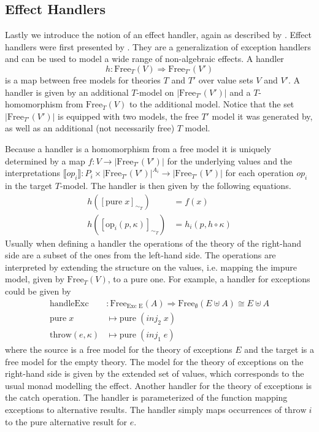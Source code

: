 \subsection{Effect Handlers}
\label{preliminaries:handler}

Lastly we introduce the notion of an effect handler, again as described by
\textcite{DBLP:journals/corr/abs-1807-05923}.
Effect handlers were first presented by \textcite{DBLP:conf/esop/PlotkinP09}.
They are a generalization of exception handlers and can be used to model a wide
range of non-algebraic effects.
A handler
\[
  h : \mathrm{Free}_{T}(V) \Rightarrow \mathrm{Free}_{T'}(V')
\]
is a map between free models for theories $T$ and $T'$ over value sets $V$ and
$V'$.
A handler is given by an additional $T$-model on $|\mathrm{Free}_{T'}(V')|$ and
a $T$-homomorphism from $\mathrm{Free}_{T}(V)$ to the additional model.
Notice that the set $|\mathrm{Free}_{T'}(V')|$ is equipped with two models, the
free $T'$ model it was generated by, as well as an additional (not necessarily
free) $T$ model.

Because a handler is a homomorphism from a free model it is uniquely determined
by a map $f : V \rightarrow |\mathrm{Free}_{T'}(V')|$ for the underlying
values and the interpretations $\lBrack op_i \rBrack : P_i \times
|\mathrm{Free}_{T'}(V')|^{A_i} \rightarrow |\mathrm{Free}_{T'}(V')|$ for each
operation $op_i$ in the target $T$-model.
The handler is then given by the following equations.
\begin{align*}
  h([\mathrm{pure}\;x]_{\sim_T}) &= f(x) \\
  h([\mathrm{op}_i(p,\kappa)]_{\sim_T}) &= h_i(p, h\circ\kappa )
\end{align*}
Usually when defining a handler the operations of the theory of the right-hand
side are a subset of the ones from the left-hand side.
The operations are interpreted by extending the structure on the values, i.e.
mapping the impure model, given by $\mathrm{Free}_T(V)$, to a pure one.
For example, a handler for exceptions could be given by
\begin{align*}
  \mathrm{handleExc} &: \mathrm{Free}_{\text{Exc E}}(A) \Rightarrow
  \mathrm{Free}_\emptyset(E \uplus A) \cong E \uplus A \\
  \mathrm{pure}\;x&\mapsto \mathrm{pure}\; (inj_2\; x) \\
  \mathrm{throw}(e, \kappa)&\mapsto \mathrm{pure}\; (inj_1\; e) 
\end{align*}
where the source is a free model for the theory of exceptions $E$ and the target
is a free model for the empty theory.
The model for the theory of exceptions on the right-hand side is given by the
extended set of values, which corresponds to the usual monad modelling the
effect.
Another handler for the theory of exceptions is the $\mathrm{catch}$ operation.
The handler is parameterized of the function mapping exceptions to alternative
results.
The handler simply maps occurrences of $\mathrm{throw}\;i$ to the $\mathrm{pure}$
alternative result for $e$.

